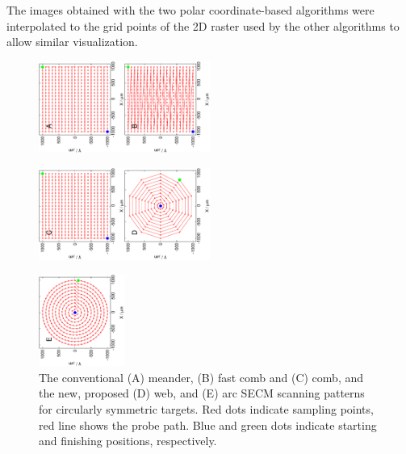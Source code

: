 \documentclass[3p]{elsarticle}
\begin{document}
The images obtained with the two polar coordinate-based algorithms were interpolated to the grid points of the 2D raster used by the other algorithms to allow similar visualization.

\begin{figure}
\centering
\includegraphics[trim = 0mm 20mm 0mm 20mm, clip, width=0.25\textwidth, angle=-90]{meander_pattern.eps}\includegraphics[trim = 0mm 20mm 0mm 20mm, clip, width=0.25\textwidth, angle=-90]{fastcomb_pattern.eps}

\includegraphics[trim = 0mm 20mm 0mm 20mm, clip, width=0.25\textwidth, angle=-90]{comb_pattern.eps}\includegraphics[trim = 0mm 20mm 0mm 20mm, clip, width=0.25\textwidth, angle=-90]{web_pattern.eps}

\includegraphics[trim = 0mm 20mm 0mm 20mm, clip, width=0.25\textwidth, angle=-90]{arc_pattern.eps}
\caption{The conventional (A) meander, (B) fast comb and (C) comb, and the new, proposed (D) web, and (E) arc SECM scanning patterns for circularly symmetric targets. Red dots indicate sampling points, red line shows the probe path. Blue and green dots indicate starting and finishing positions, respectively.}
\label{fig:patterns}
\end{figure}
\end{document}
